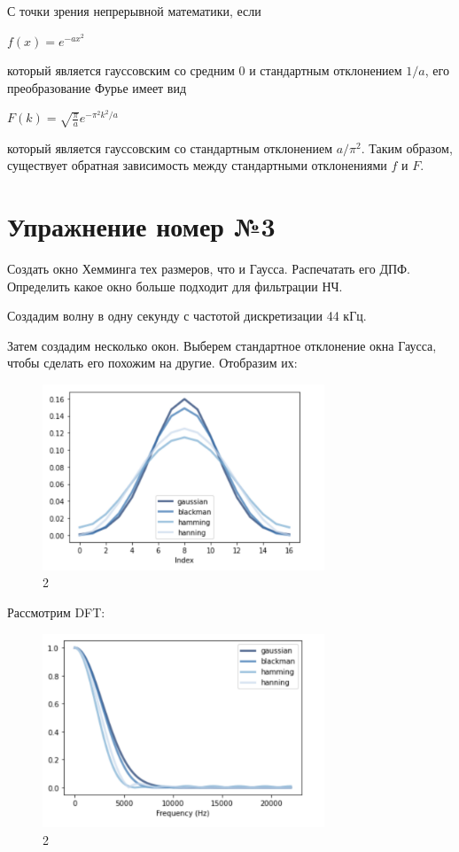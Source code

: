 \documentclass[10pt,a4paper,oneside]{article}
\begin{document}
С точки зрения непрерывной математики, если

$f(x) = e^{-a x^2}$

который является гауссовским со средним 0 и стандартным отклонением $1/a$, его преобразование Фурье имеет вид

$F(k) = \sqrt{\frac{\pi}{a}} e^{-\pi^2 k^2/a}$

который является гауссовским со стандартным отклонением $a / \pi^2$. Таким образом, существует обратная зависимость между стандартными отклонениями $f$ и $F$.

\section{Упражнение номер №3}

Создать окно Хемминга тех размеров, что и Гаусса. Распечатать его ДПФ. Определить какое окно больше подходит для фильтрации НЧ.

Создадим волну в одну секунду с частотой дискретизации 44 кГц.

Затем создадим несколько окон. Выберем стандартное отклонение окна Гаусса, чтобы сделать его похожим на другие. Отобразим их:

\begin{figure}[H]
        \centering
        \includegraphics[width=0.75\textwidth]{pics/5.png}
        \caption{2}
        \label{fig:first}
\end{figure}

Рассмотрим DFT:

\begin{figure}[H]
        \centering
        \includegraphics[width=0.75\textwidth]{pics/6.png}
        \caption{2}
        \label{fig:first}
\end{figure}
\end{document}
